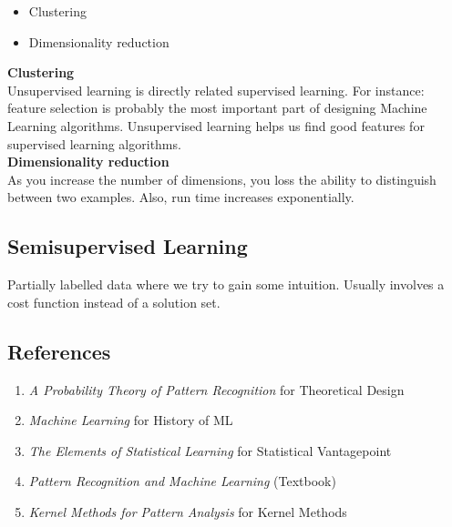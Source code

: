 \documentclass[12pt]{article}
\begin{document}
\begin{itemize}[noitemsep]
\item Clustering
\item Dimensionality reduction
\end{itemize}

\textbf{Clustering}\\

Unsupervised learning is directly related supervised learning. For instance: feature selection is probably the most important part of designing Machine Learning algorithms. Unsupervised learning helps us find good features for supervised learning algorithms.\\

\textbf{Dimensionality reduction}\\

As you increase the number of dimensions, you loss the ability to distinguish between two examples. Also, run time increases exponentially.

\subsection{Semisupervised Learning}

Partially labelled data where we try to gain some intuition. Usually involves a cost function instead of a solution set.


\subsection{References}

\begin{enumerate}[noitemsep]
\item \textit{A Probability Theory of Pattern Recognition} for Theoretical Design
\item \textit{Machine Learning} for History of ML
\item \textit{The Elements of Statistical Learning} for Statistical Vantagepoint
\item \textit{Pattern Recognition and Machine Learning} (Textbook)
\item \textit{Kernel Methods for Pattern Analysis} for Kernel Methods
\end{enumerate}
\end{document}
